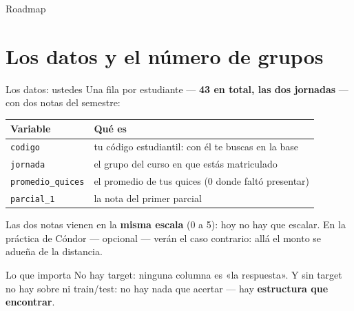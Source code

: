 \documentclass{beamer}
\begin{document}
\begin{frame}[noframenumbering]{Roadmap}
\tableofcontents
\end{frame}

\section{Los datos y el número de grupos}


\begin{frame}{Los datos: ustedes}
\small
Una fila por estudiante --- \textbf{43 en total, las dos jornadas} --- con dos notas del semestre:

\vspace{0.15cm}
\begin{center}
\scriptsize
\setlength{\tabcolsep}{5pt}
\begin{tabular}{@{}l l@{}}
\toprule
\textbf{Variable} & \textbf{Qué es} \\
\midrule
\texttt{codigo} & tu código estudiantil: con él te buscas en la base \\
\texttt{jornada} & el grupo del curso en que estás matriculado \\
\texttt{promedio\_quices} & el promedio de tus quices (0 donde faltó presentar) \\
\texttt{parcial\_1} & la nota del primer parcial \\
\bottomrule
\end{tabular}
\end{center}

\vspace{0.15cm}
Las dos notas vienen en la \textbf{misma escala} (0 a 5): hoy no hay que escalar. En la práctica de Cóndor --- opcional --- verán el caso contrario: allá el monto se adueña de la distancia.

\vspace{0.1cm}
\begin{alertblock}{Lo que importa}
No hay target: ninguna columna es «la respuesta». Y sin target no hay sobre ni train/test: no hay nada que acertar --- hay \textbf{estructura que encontrar}.
\end{alertblock}
\end{frame}
\end{document}
